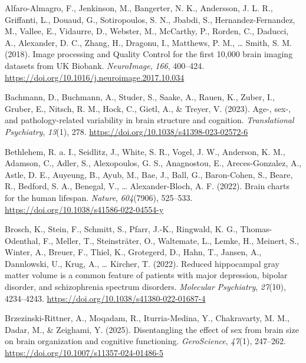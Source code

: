 \documentclass[
]{article}
\newlength{\cslhangindent}
\newenvironment{CSLReferences}[2] %
 {\begin{list}{}{%
  \setlength{\itemindent}{0pt}
  \setlength{\leftmargin}{0pt}
  \setlength{\parsep}{0pt}
  \ifodd #1
   \setlength{\leftmargin}{\cslhangindent}
   \setlength{\itemindent}{-1\cslhangindent}
  \fi
  \setlength{\itemsep}{#2\baselineskip}}}
 {\end{list}}
\begin{document}
\label{refs}
\begin{CSLReferences}{1}{0}
Alfaro-Almagro, F., Jenkinson, M., Bangerter, N. K., Andersson, J. L.
R., Griffanti, L., Douaud, G., Sotiropoulos, S. N., Jbabdi, S.,
Hernandez-Fernandez, M., Vallee, E., Vidaurre, D., Webster, M.,
McCarthy, P., Rorden, C., Daducci, A., Alexander, D. C., Zhang, H.,
Dragonu, I., Matthews, P. M., \ldots{} Smith, S. M. (2018). Image
processing and {Quality} {Control} for the first 10,000 brain imaging
datasets from {UK} {Biobank}. \emph{NeuroImage}, \emph{166}, 400--424.
\url{https://doi.org/10.1016/j.neuroimage.2017.10.034}

Bachmann, D., Buchmann, A., Studer, S., Saake, A., Rauen, K., Zuber, I.,
Gruber, E., Nitsch, R. M., Hock, C., Gietl, A., \& Treyer, V. (2023).
Age-, sex-, and pathology-related variability in brain structure and
cognition. \emph{Translational Psychiatry}, \emph{13}(1), 278.
\url{https://doi.org/10.1038/s41398-023-02572-6}

Bethlehem, R. a. I., Seidlitz, J., White, S. R., Vogel, J. W., Anderson,
K. M., Adamson, C., Adler, S., Alexopoulos, G. S., Anagnostou, E.,
Areces-Gonzalez, A., Astle, D. E., Auyeung, B., Ayub, M., Bae, J., Ball,
G., Baron-Cohen, S., Beare, R., Bedford, S. A., Benegal, V., \ldots{}
Alexander-Bloch, A. F. (2022). Brain charts for the human lifespan.
\emph{Nature}, \emph{604}(7906), 525--533.
\url{https://doi.org/10.1038/s41586-022-04554-y}

Brosch, K., Stein, F., Schmitt, S., Pfarr, J.-K., Ringwald, K. G.,
Thomas-Odenthal, F., Meller, T., Steinsträter, O., Waltemate, L., Lemke,
H., Meinert, S., Winter, A., Breuer, F., Thiel, K., Grotegerd, D., Hahn,
T., Jansen, A., Dannlowski, U., Krug, A., \ldots{} Kircher, T. (2022).
Reduced hippocampal gray matter volume is a common feature of patients
with major depression, bipolar disorder, and schizophrenia spectrum
disorders. \emph{Molecular Psychiatry}, \emph{27}(10), 4234--4243.
\url{https://doi.org/10.1038/s41380-022-01687-4}

Brzezinski-Rittner, A., Moqadam, R., Iturria-Medina, Y., Chakravarty, M.
M., Dadar, M., \& Zeighami, Y. (2025). Disentangling the effect of sex
from brain size on brain organization and cognitive functioning.
\emph{GeroScience}, \emph{47}(1), 247--262.
\url{https://doi.org/10.1007/s11357-024-01486-5}


\end{CSLReferences}
\end{document}
